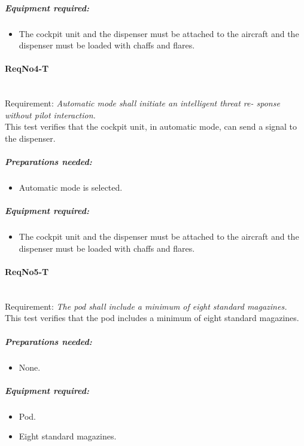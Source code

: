 	\subparagraph{Equipment required:}
	\begin{itemize}
	\item The cockpit unit and the dispenser must be attached to the aircraft and the dispenser must be loaded with chaffs and flares.
	\end{itemize}	


\paragraph{ReqNo4-T}\mbox{}\\ %
Requirement: \textit{Automatic mode shall initiate an intelligent threat re-
sponse without pilot interaction.}\\
This test verifies that the cockpit unit, in automatic mode, can send a signal to the dispenser.

	\subparagraph{Preparations needed:}
	\begin{itemize}
	\item Automatic mode is selected.
	\end{itemize}
	
	\subparagraph{Equipment required:}
	\begin{itemize}
	\item The cockpit unit and the dispenser must be attached to the aircraft and the dispenser must be loaded with chaffs and flares.
	\end{itemize}	

\paragraph{ReqNo5-T}\mbox{}\\ %
Requirement: \textit{The pod shall include a minimum of eight standard magazines.}\\
This test verifies that the pod includes a minimum of eight standard magazines.
	
	\subparagraph{Preparations needed:}
	\begin{itemize}
	\item None.
	\end{itemize}
	
	
	\subparagraph{Equipment required:}
	\begin{itemize}
	\item Pod.
	\item Eight standard magazines.
	\end{itemize}

